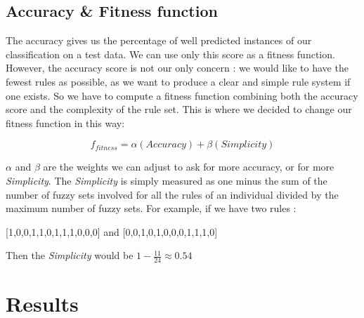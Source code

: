 \documentclass[a4paper,12pt]{article}
\begin{document}
\subsection{Accuracy \& Fitness function}

The accuracy gives us the percentage of well predicted instances of our classification on a test data. We can use only this score as a fitness function.
However, the accuracy score is not our only concern : we would like to have the fewest rules as possible, as we want to produce a clear and simple rule system if one exists. So we have to compute a fitness function combining both the accuracy score and the complexity of the rule set.
This is where we decided to change our fitness function in this way:

\[f_{fitness}=\alpha (Accuracy)+\beta(Simplicity)\]

$\alpha$ and $\beta$ are the weights we can adjust to ask for more accuracy, or for more \textit{Simplicity}.
The \textit{Simplicity} is simply measured as one minus the sum of the number of fuzzy sets involved for all the rules of an individual divided by the maximum number of fuzzy sets. 
For example, if we have two rules :
\begin{center}[1,0,0,1,1,0,1,1,1,0,0,0] and [0,0,1,0,1,0,0,0,1,1,1,0]
\end{center}
Then the \textit{Simplicity} would be $1 - \frac{11}{24} \approx 0.54	$


\section{Results}
\end{document}
